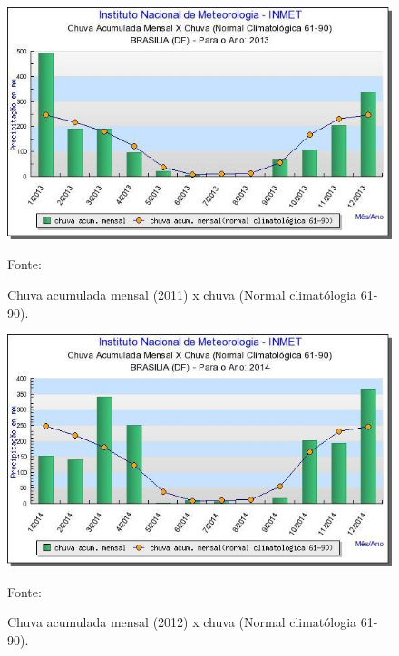 \begin{figure}[H]
	 \centering
	\label{Chuva acumulada mensal (2013) x chuva (Normal climatólogia 61-90)}
	 \includegraphics[scale=0.6]{captacao/3.jpg}
	 \caption{Chuva acumulada mensal (2011) x chuva (Normal climatólogia 61-90).}
	\small{Fonte: \cite{INMET}}
\end{figure}
 
 
\begin{figure}[H]
	 \centering
	\label{Chuva acumulada mensal (2014) x chuva (Normal climatólogia 61-90)}
	 \includegraphics[scale=0.6]{captacao/4.jpg}
	 \caption{Chuva acumulada mensal (2012) x chuva (Normal climatólogia 61-90).}
	\small{Fonte: \cite{INMET}}
\end{figure}

